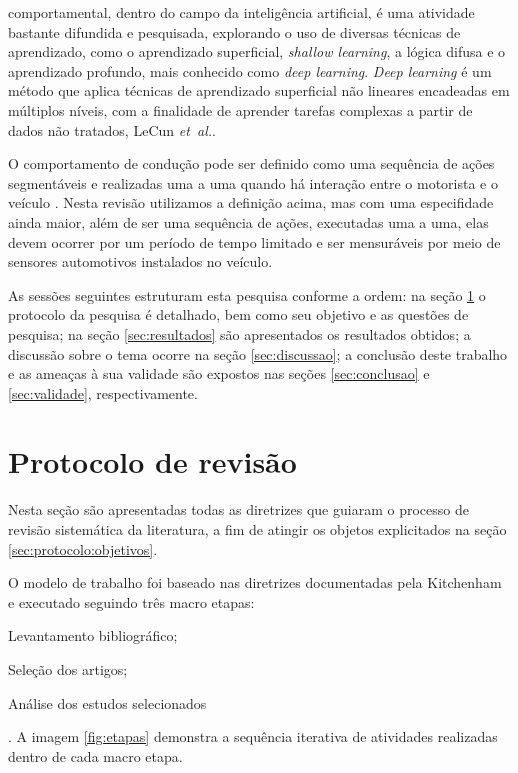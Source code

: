 \documentclass[10pt,journal,compsoc]{IEEEtran}
\begin{document}

 comportamental, dentro do campo da inteligência artificial, é uma
atividade bastante difundida e pesquisada, explorando o uso de diversas técnicas de aprendizado,
como o aprendizado superficial, \textit{shallow learning}, a lógica
difusa e o aprendizado profundo, mais conhecido como \textit{deep
  learning}. \textit{Deep learning} é um método que aplica
técnicas de aprendizado superficial não lineares encadeadas em múltiplos níveis, com a finalidade de aprender tarefas complexas a partir de dados não
tratados, LeCun \emph{et~al.}\cite{Lecun2015436}.

O comportamento de condução pode ser definido como uma sequência de
ações segmentáveis e realizadas uma a uma quando há interação entre o motorista e o
veículo \cite{Liu2016}. Nesta revisão
utilizamos a definição acima, mas com uma especifidade ainda maior,
além de ser uma sequência de ações, executadas uma a uma, elas devem
ocorrer por um período de tempo limitado e ser mensuráveis por meio de
sensores automotivos instalados no veículo.

As sessões seguintes estruturam esta pesquisa conforme a ordem: na seção
\ref{sec:protocolo} o protocolo da pesquisa é detalhado, bem como seu
objetivo e as questões de pesquisa; na seção \ref{sec:resultados}
são apresentados os resultados obtidos; a discussão sobre o tema
ocorre na seção \ref{sec:discussao}; a conclusão deste trabalho e as
ameaças à sua validade são expostos nas seções \ref{sec:conclusao} e
\ref{sec:validade}, respectivamente.

\section{Protocolo de revisão}
\label{sec:protocolo}
Nesta seção são apresentadas todas as diretrizes que guiaram o
processo de revisão sistemática da literatura, a fim de atingir os
objetos explicitados na seção \ref{sec:protocolo:objetivos}.

O modelo de trabalho foi baseado nas diretrizes
documentadas pela Kitchenham \cite{kitchenham2007} e executado
seguindo três macro etapas:
\begin{enumerate*}
\item Levantamento bibliográfico;
\item Seleção dos artigos;
\item Análise dos estudos selecionados
\end{enumerate*}. A imagem \ref{fig:etapas} demonstra a sequência iterativa de
atividades realizadas dentro de cada macro etapa.
\end{document}
